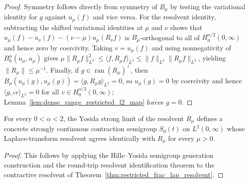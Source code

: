 \begin{proof}
\leanok
Symmetry follows directly from symmetry of $B_\mu$ by testing the variational identity for $g$ against $u_\mu(f)$ and vice versa. For the resolvent identity, subtracting the shifted variational identities at $\mu$ and $\nu$ shows that $u_\mu(f) - u_\nu(f) - (\nu - \mu) u_\mu(R_\nu f)$ is $B_\mu$-orthogonal to all of $H^{\alpha/2}_0(0,\infty)$ and hence zero by coercivity. Taking $v = u_\mu(f)$ and using nonnegativity of $B^\alpha_0(u_\mu, u_\mu)$ gives $\mu \lVert R_\mu f \rVert_{L^2}^2 \le \langle f, R_\mu f \rangle_{L^2} \le \lVert f \rVert_{L^2} \lVert R_\mu f \rVert_{L^2}$, yielding $\lVert R_\mu \rVert \le \mu^{-1}$. Finally, if $g \in \operatorname{ran}(R_\mu)^\perp$, then $B_\mu(u_\mu(g), u_\mu(g)) = \langle g, R_\mu g \rangle_{L^2} = 0$, so $u_\mu(g) = 0$ by coercivity and hence $\langle g, \iota v \rangle_{L^2} = 0$ for all $v \in H^{\alpha/2}_0(0,\infty)$; Lemma~\ref{lem:dense_range_restricted_l2_map} forces $g = 0$.
\end{proof}

\begin{theorem}\label{thm:restricted_frac_lap_semigroup}
\leanok
For every $0 < \alpha < 2$, the Yosida strong limit of the resolvent $R_\mu$ defines a concrete strongly continuous contraction semigroup $S_0(t)$ on $L^2(0,\infty)$ whose Laplace-transform resolvent agrees identically with $R_\mu$ for every $\mu > 0$.
\end{theorem}

\begin{proof}
\leanok
This follows by applying the Hille--Yosida semigroup generation construction and the round-trip resolvent identification theorem to the contractive resolvent of Theorem~\ref{thm:restricted_frac_lap_resolvent}.
\end{proof}

